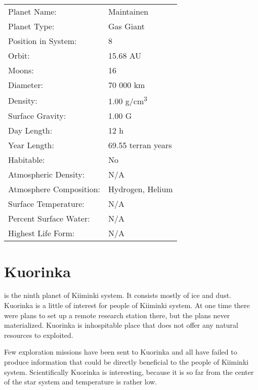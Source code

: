 \documentclass{tufte-book}
\begin{document}
\bigskip
\begin{minipage}{\textwidth}
\begin{center}
\begin{tabular}{ll}
\toprule
Planet Name: & Maintainen \\
Planet Type: & Gas Giant \\
Position in System: & 8 \\
Orbit: & 15.68 AU \\
Moons: & 16 \\
Diameter: & 70 000 km \\
Density: & 1.00 g/cm\textsuperscript{3} \\
Surface Gravity: & 1.00 G \\
Day Length: & 12 h \\
Year Length: & 69.55 terran years \\
Habitable: & No \\
\quad Atmospheric Density: & N/A \\
\quad Atmosphere Composition: & Hydrogen, Helium \\
\quad Surface Temperature: & N/A \\
\quad Percent Surface Water: & N/A \\
\quad Highest Life Form: & N/A \\

\bottomrule
\end{tabular}
\end{center}
\end{minipage}


\section{Kuorinka}

 is the ninth planet of Kiiminki system. It consists
mostly of ice and dust. Kuorinka is a little of interest for people of
Kiiminki system. At one time there were plans to set up a remote research
station there, but the plans never materialized. Kuorinka is inhospitable
place that does not offer any natural resources to exploited.

Few exploration missions have been sent to Kuorinka and all have failed
to produce information that could be directly beneficial to the people 
of Kiiminki system. Scientifically Kuorinka is interesting, because it
is so far from the center of the star system and temperature is rather
low.
\end{document}
